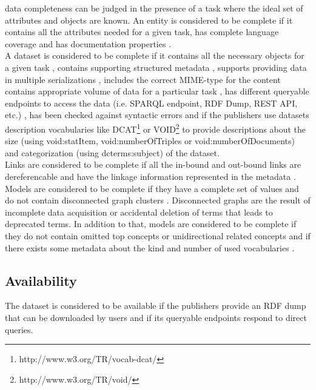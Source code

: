 \documentclass[onecolumn, crcready]{iosart2c}
\begin{document}
data completeness can be judged in the presence of a task where the ideal set of attributes and objects are known. An entity is considered to be complete if it contains all the attributes needed for a given task, has complete language coverage \cite{Mader2012} and has documentation properties \cite{w3c_skos_rec}\cite{Mader2012}.\\ A dataset is considered to be complete if it contains all the necessary objects for a given task \cite{Mendes2012}, contains supporting structured metadata \cite{Hogan2010}, supports providing data in multiple serializations \cite{Framework2012}, includes the correct MIME-type for the content \cite{Hogan2010} contains appropriate volume of data for a particular task \cite{Framework2012}, has different queryable endpoints to access the data (i.e. SPARQL endpoint, RDF Dump, REST API, etc.) \cite{Framework2012}, has been checked against syntactic errors \cite{Hogan2010} and if the publishers use datasets description vocabularies like DCAT\footnote{http://www.w3.org/TR/vocab-dcat/} or VOID\footnote{http://www.w3.org/TR/void/} to provide descriptions about the size (using void:statItem, void:numberOfTriples or void:numberOfDocuments) and categorization (using dcterms:subject) of the dataset.\\ Links are considered to be complete if all the in-bound and out-bound links are dereferencable \cite{Hogan2010}\cite{Mader2012}\cite{Gueret2012} and have the linkage information represented in the metadata \cite{Hogan2010}.\\ Models are considered to be complete if they have a complete set of values \cite{Mader2012} and do not contain disconnected graph clusters \cite{Mader2012}. Disconnected graphs are the result of incomplete data acquisition or accidental deletion of terms that leads to deprecated terms. In addition to that, models are considered to be complete if they do not contain omitted top concepts or unidirectional related concepts \cite{Hogan2010} and if there exists some metadata about the kind and number of used vocabularies \cite{Framework2012}.

\subsection{Availability}

The dataset is considered to be available if the publishers provide an RDF dump that can be downloaded by users \cite{flemming2010}\cite{Hogan2010} and if its queryable endpoints respond to direct queries.
\end{document}
